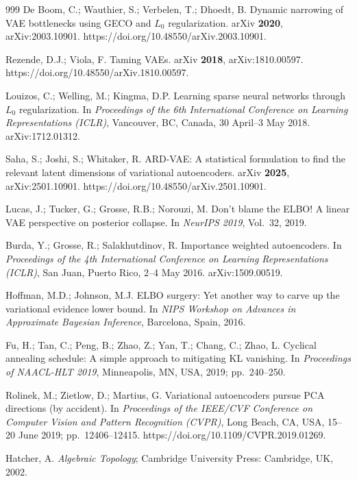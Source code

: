 \documentclass[11pt,a4paper]{jsarticle}
\begin{document}
\begin{thebibliography}{999}
De Boom, C.; Wauthier, S.; Verbelen, T.; Dhoedt, B.
Dynamic narrowing of VAE bottlenecks using GECO and $L_0$ regularization.
arXiv \textbf{2020}, arXiv:2003.10901.
https://doi.org/10.48550/arXiv.2003.10901.

Rezende, D.J.; Viola, F.
Taming VAEs.
arXiv \textbf{2018}, arXiv:1810.00597.
https://doi.org/10.48550/arXiv.1810.00597.

Louizos, C.; Welling, M.; Kingma, D.P.
Learning sparse neural networks through $L_0$ regularization.
In \textit{Proceedings of the 6th International Conference on Learning
Representations (ICLR)}, Vancouver, BC, Canada, 30 April--3 May 2018.
arXiv:1712.01312.

Saha, S.; Joshi, S.; Whitaker, R.
ARD-VAE: A statistical formulation to find the relevant latent dimensions
of variational autoencoders.
arXiv \textbf{2025}, arXiv:2501.10901.
https://doi.org/10.48550/arXiv.2501.10901.

Lucas, J.; Tucker, G.; Grosse, R.B.; Norouzi, M.
Don't blame the ELBO! A linear VAE perspective on posterior collapse.
In \textit{NeurIPS 2019}, Vol.~32, 2019.

Burda, Y.; Grosse, R.; Salakhutdinov, R.
Importance weighted autoencoders.
In \textit{Proceedings of the 4th International Conference on Learning
Representations (ICLR)}, San Juan, Puerto Rico, 2--4 May 2016.
arXiv:1509.00519.

Hoffman, M.D.; Johnson, M.J.
{ELBO} surgery: Yet another way to carve up the variational evidence lower
bound.
In \textit{NIPS Workshop on Advances in Approximate Bayesian Inference},
Barcelona, Spain, 2016.

Fu, H.; Tan, C.; Peng, B.; Zhao, Z.; Yan, T.; Chang, C.; Zhao, L.
Cyclical annealing schedule: A simple approach to mitigating {KL} vanishing.
In \textit{Proceedings of NAACL-HLT 2019}, Minneapolis, MN, USA, 2019;
pp.~240--250.

Rolinek, M.; Zietlow, D.; Martius, G.
Variational autoencoders pursue PCA directions (by accident).
In \textit{Proceedings of the IEEE/CVF Conference on Computer Vision and
Pattern Recognition (CVPR)}, Long Beach, CA, USA, 15--20 June 2019;
pp.\ 12406--12415. https://doi.org/10.1109/CVPR.2019.01269.

Hatcher, A.
\textit{Algebraic Topology};
Cambridge University Press: Cambridge, UK, 2002.


\end{thebibliography}
\end{document}
